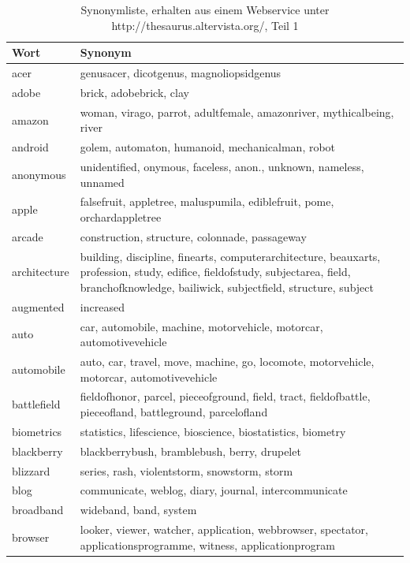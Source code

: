 \documentclass[12pt,a4paper]{report}
\begin{document}
\iffalse
	\begin{table}[H]
\caption{Synonymliste, erhalten aus einem Webservice unter http://thesaurus.altervista.org/, Teil 1}
\begin{center}
\begin{tabular}{ |l|p{13cm}|}
\hline
\textbf{Wort} & \textbf{Synonym}\\
\hline
acer & genusacer, dicotgenus, magnoliopsidgenus\\
\hline
adobe & brick, adobebrick, clay\\
\hline
amazon & woman, virago, parrot, adultfemale, amazonriver, mythicalbeing, river\\
\hline
android & golem, automaton, humanoid, mechanicalman, robot\\
\hline
anonymous & unidentified, onymous, faceless, anon., unknown, nameless, unnamed\\
\hline
apple & falsefruit, appletree, maluspumila, ediblefruit, pome, orchardappletree\\
\hline
arcade & construction, structure, colonnade, passageway\\
\hline
architecture & building, discipline, finearts, computerarchitecture, beauxarts, profession, study, edifice, fieldofstudy, subjectarea, field, branchofknowledge, bailiwick, subjectfield, structure, subject\\
\hline
augmented & increased\\
\hline
auto & car, automobile, machine, motorvehicle, motorcar, automotivevehicle\\
\hline
automobile & auto, car, travel, move, machine, go, locomote, motorvehicle, motorcar, automotivevehicle\\
\hline
battlefield & fieldofhonor, parcel, pieceofground, field, tract, fieldofbattle, pieceofland, battleground, parcelofland\\
\hline
biometrics & statistics, lifescience, bioscience, biostatistics, biometry\\
\hline
blackberry & blackberrybush, bramblebush, berry, drupelet\\
\hline
blizzard & series, rash, violentstorm, snowstorm, storm\\
\hline
blog & communicate, weblog, diary, journal, intercommunicate\\
\hline
broadband & wideband, band, system\\
\hline
browser & looker, viewer, watcher, application, webbrowser, spectator, applicationsprogramme, witness, applicationprogram\\

\end{tabular}
\end{center}
\end{table}
\end{document}
